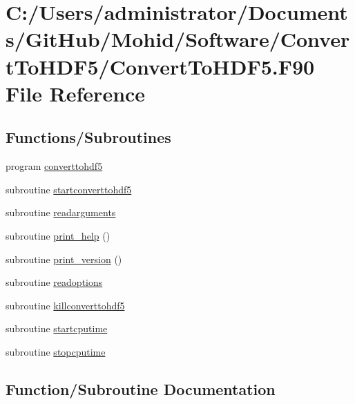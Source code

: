 \hypertarget{_convert_to_h_d_f5_8_f90}{}\section{C\+:/\+Users/administrator/\+Documents/\+Git\+Hub/\+Mohid/\+Software/\+Convert\+To\+H\+D\+F5/\+Convert\+To\+H\+D\+F5.F90 File Reference}
\label{_convert_to_h_d_f5_8_f90}
\subsection*{Functions/\+Subroutines}
\begin{DoxyCompactItemize}
\item 
program \mbox{\hyperlink{_convert_to_h_d_f5_8_f90_aadfe1d94209a839bcb931b2d15d0d814}{converttohdf5}}
\item 
subroutine \mbox{\hyperlink{_convert_to_h_d_f5_8_f90_aae05b4c91bf88e26202fcc1b279beddf}{startconverttohdf5}}
\item 
subroutine \mbox{\hyperlink{_convert_to_h_d_f5_8_f90_adf9fee08c1e27d953753809c2a20cbdd}{readarguments}}
\item 
subroutine \mbox{\hyperlink{_convert_to_h_d_f5_8_f90_a69583c57127dc2e683fb385db8cc755c}{print\+\_\+help}} ()
\item 
subroutine \mbox{\hyperlink{_convert_to_h_d_f5_8_f90_ae9f61003f0dd6307a56f6998f03de19b}{print\+\_\+version}} ()
\item 
subroutine \mbox{\hyperlink{_convert_to_h_d_f5_8_f90_a2233a80cf5c89674ce4f80d91531c0ea}{readoptions}}
\item 
subroutine \mbox{\hyperlink{_convert_to_h_d_f5_8_f90_ae1cc4187af20917b66ab29a90f402338}{killconverttohdf5}}
\item 
subroutine \mbox{\hyperlink{_convert_to_h_d_f5_8_f90_a76e597f0cbb118ca396467443f56d32c}{startcputime}}
\item 
subroutine \mbox{\hyperlink{_convert_to_h_d_f5_8_f90_a672d8c511194ec59eff097fd233d3a4e}{stopcputime}}
\end{DoxyCompactItemize}


\subsection{Function/\+Subroutine Documentation}
\mbox{\label{_convert_to_h_d_f5_8_f90_aadfe1d94209a839bcb931b2d15d0d814}} 

